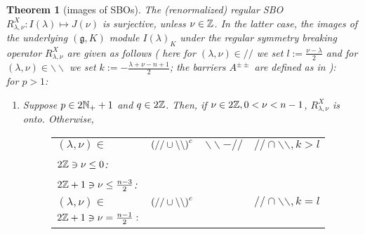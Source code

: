 \documentclass[12pt]{article} %
\newtheorem{theorem}{Theorem}
\theoremstyle{definition}
\theoremstyle{exampstyle} \newtheorem{examp}[theorem]{Theorem}
\newcommand{\even}{2\Z}
\newcommand{\odd}{2\Z+1}
\begin{document}
\begin{theorem}[images of SBOs]
	The (renormalized) regular SBO $R_{\lambda,\nu}^X:I(\lambda)\mapsto J(\nu)$ is surjective,
	unless $\nu\in\mathbb{Z}$. In the latter case, the images of the underlying $(\mathfrak{g},K)$ module $I(\lambda)_K$ under the
	regular symmetry breaking operator $R_{\lambda,\nu}^X$ are given as follows (
	here for $(\lambda,\nu)\in//$ we set $l:=\frac{\nu-\lambda}{2}$ and for $(\lambda,\nu)\in\backslash\backslash$ we set
	$k:=-\frac{\lambda+\nu-n+1}{2}$; the barriers $A^{\pm\pm}$ are defined as in \cite{howe1993homogeneous}): \\
	for $p>1$:
	\begin{enumerate}
	\item Suppose $p\in2\mathbb{N}_++1$ and $q\in2\mathbb{Z}$. Then, if $\nu\in2\mathbb{Z},0<\nu<n-1$, $R_{\lambda,\nu}^X$ is onto. Otherwise,
	  \begin{figure}[H]
	    \hskip-3.6cm\noindent\begin{tabular}{m{3.5cm}ccc}
	      $(\lambda,\nu)\in$&$\left(//\cup\backslash\backslash\right)^c$ & $\backslash\backslash-//$  & $//\cap\backslash\backslash,k> l$\\[15pt]
	      {\vspace{-3cm} $ \even\ni\nu\leq0$}:&\\[15pt]
	      \vspace{-3cm}$\odd\ni\nu\leq\frac{n-3}{2}$:&\\[25pt]
	      $(\lambda,\nu)\in$&$\left(//\cup\backslash\backslash\right)^c$ && $//\cap\backslash\backslash,k=l$\\[15pt]
	      \vspace{-3cm}$\odd\ni\nu=\frac{n-1}{2}:$&\\[25pt]

\end{tabular}
\end{figure}
\end{enumerate}
\end{theorem}
\end{document}
